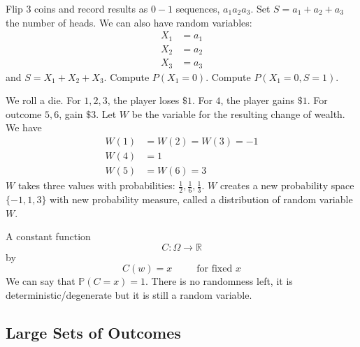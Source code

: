 \documentclass{report}
\begin{document}
\begin{examples}
    \begin{example}
        Flip $3$ coins and record results as $0 - 1$ sequences, $a_{1}a_{2}a_{3}$. Set $S = a_{1} + a_{2} + a_{3}$ the number of heads. We can also have random variables: 
            \begin{align*}
                X_{1} &= a_{1} \\
                X_{2} &= a_{2} \\
                X_{3} &= a_{3}   
            \end{align*}
        and $S = X_{1} + X_{2} + X_{3}$. Compute $P(X_{1} = 0)$. Compute $P(X_{1} = 0, S = 1)$.
    \end{example}
    \begin{example}
        We roll a die. For $1, 2, 3$, the player loses $\$1$. For $4$, the player gains $\$1$. For outcome $5, 6$, gain $\$3$. Let $W$ be the variable for the resulting change of wealth. We have 
            \begin{align*}
                W(1) &= W(2) = W(3) = -1 \\
                W(4) &= 1                \\
                W(5) &= W(6) = 3           
            \end{align*}
        $W$ takes three values with probabilities: $\frac{1}{2}, \frac{1}{6}, \frac{1}{3}$. $W$ creates a new probability space $\{-1, 1, 3\}$ with new probability measure, called a distribution of random variable $W$. 
    \end{example}
    \begin{example}
        A constant function
            \begin{equation*}
                C : \Omega \rightarrow \mathbb{R}
            \end{equation*}
        by
            \begin{equation*}
                C(w) = x \hspace{30pt}  \text{for fixed $x$}
            \end{equation*}
        We can say that $\mathbb{P}(C = x) = 1$. There is no randomness left, it is deterministic/degenerate but it is still a random variable.
    \end{example}
\end{examples}

\begin{topic}
    \section{Large Sets of Outcomes}
\end{topic}
\end{document}
